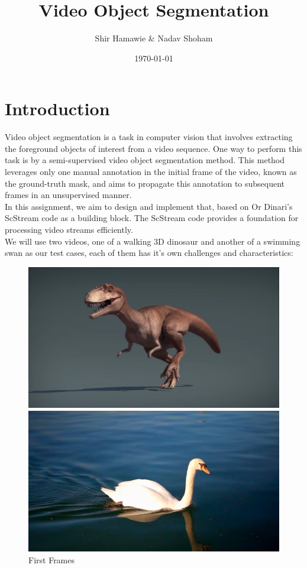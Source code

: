 \documentclass[12pt]{article}
\title{Video Object Segmentation}
\author{Shir Hamawie \& Nadav Shoham}
\date{\today}
\begin{document}
\maketitle
    \section{Introduction}\label{sec:intro}
    Video object segmentation is a task in computer vision that involves extracting the foreground objects of interest from a video sequence.
    One way to perform this task is by a semi-supervised video object segmentation method.
    This method leverages only one manual annotation in the initial frame of the video, known as the ground-truth mask, and aims to propagate this annotation to subsequent frames in an unsupervised manner. \\
    In this assignment, we aim to design and implement that, based on Or Dinari's ScStream code as a building block.
    The ScStream code provides a foundation for processing video streams efficiently. \\
We will use two videos, one of a walking 3D dinosaur and another of a swimming swan as our test cases, each of them has it's own challenges and characteristics:
\begin{figure}[h!]
    \begin{minipage}{0.5\textwidth}
    \centering
    \includegraphics[scale=0.4]{images/dinosaur/first_frame_ratio1.0}
    \end{minipage}
    \begin{minipage}{0.5\textwidth}
    \centering
    \includegraphics[scale=0.4]{images/swan/first_frame_ratio1.0}
    \end{minipage}
    \caption{First Frames}
    \label{fig:first_frames}
\end{figure}
\end{document}
